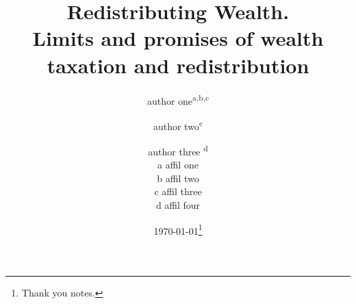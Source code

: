 \makeatletter
\patchcmd{\@footnotetext}{\footnotesize}{\scriptsize}{}{}
\makeatother

\providecommand{\keywords}[1]
{
  \small	
  \textbf{\textit{Keywords---}} #1
}


\title{Redistributing Wealth.\\
Limits and promises of wealth taxation and redistribution}

\author{
    author one\textsuperscript{a,b,c} 
    \and 
    author two\textsuperscript{c} \\
    \and
    author three \textsuperscript{d}
    {\scriptsize \centering \parbox[t]{0.8\textwidth}{\centering 
    a affil one \\ 
    b affil two\\ 
    c affil three \\
    d affil four}}
}

\date{\today\thanks{\scriptsize Thank you notes.}}



